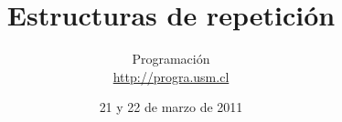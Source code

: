\documentclass[12pt]{beamer}
\title{Estructuras de repetición}
\author{
  Programación \\ \url{http://progra.usm.cl}
}
\date{21 y 22 de marzo de 2011}
\begin{document}
  \begin{frame}
    \maketitle
  \end{frame}
\end{document}
